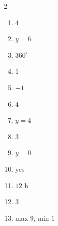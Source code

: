 \documentclass[11pt]{article}
\begin{document}
\begin{keybox}
\begin{multicols}{2}
\small
\begin{enumerate}[leftmargin=*,itemsep=3pt]
  \item $4$
  \item $y=6$
  \item $360^\circ$
  \item $1$
  \item $-1$
  \item $4$
  \item $y=4$
  \item $3$
  \item $y=0$
  \item yes
  \item $12$ h
  \item $3$
  \item max $9$, min $1$
\end{enumerate}
\end{multicols}
\end{keybox}
\end{document}
